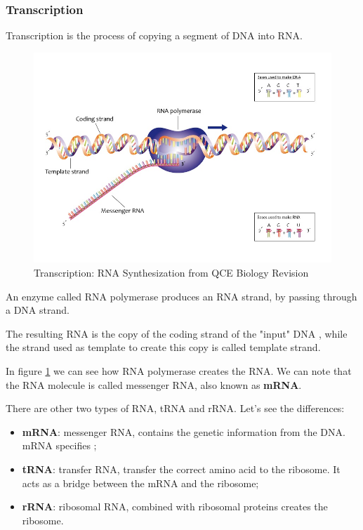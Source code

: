 \subsubsection{Transcription}
Transcription is the process of copying a segment of DNA into RNA.

\begin{figure}[h!]
	\includegraphics[scale=.53]{res/proteins_overview/rna_polymerase.jpeg}
	\centering
	\caption{Transcription: RNA Synthesization from QCE Biology Revision \cite{transcription}}
	\label{fig:transcription}
\end{figure}

An enzyme called RNA polymerase produces an RNA strand, by passing through a DNA strand. 

The resulting RNA is the copy of the coding strand of the "input" DNA , while the strand used as template to create this copy is called template strand.

In figure \ref{fig:transcription} we can see how RNA polymerase creates the RNA. We can note that the RNA molecule is called messenger RNA, also known as \textbf{mRNA}.

There are other two types of RNA, tRNA and rRNA. Let's see the differences:
\begin{itemize}
	\item \textbf{mRNA}: messenger RNA, contains the genetic information from the DNA. mRNA specifies ;
	\item \textbf{tRNA}: transfer RNA, transfer the correct amino acid to the ribosome. It acts as a bridge between the mRNA and the ribosome;
	\item \textbf{rRNA}: ribosomal RNA, combined with ribosomal proteins creates the ribosome.
\end{itemize}

